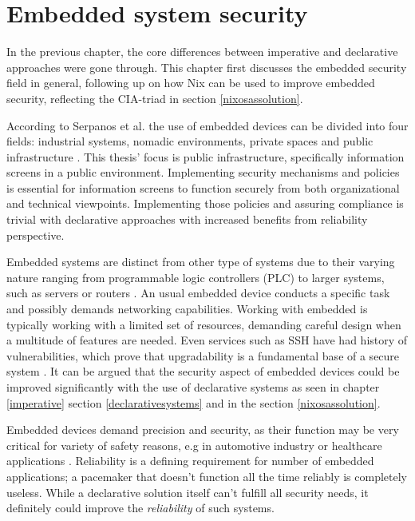 \chapter{Embedded system security} \label{embedded}

In the previous chapter, the core differences between imperative and
declarative approaches were gone through. This chapter first discusses
the embedded security field in general, following up on how Nix can be
used to improve embedded security, reflecting the CIA-triad in section
\ref{nixosassolution}.

According to Serpanos et al. the use of embedded devices can be
divided into four fields: industrial systems, nomadic environments,
private spaces and public infrastructure
\cite{serpanos2013security}. This thesis' focus is public
infrastructure, specifically information screens in a public
environment. Implementing security mechanisms and policies is
essential for information screens to function securely from both
organizational and technical viewpoints. Implementing those policies
and assuring compliance is trivial with declarative approaches with
increased benefits from reliability perspective.

Embedded systems are distinct from other type of systems due to their
varying nature ranging from programmable logic controllers (PLC) to
larger systems, such as servers or
routers \cite{fysarakis2014embedded}. An usual embedded device
conducts a specific task and possibly demands networking
capabilities. Working with embedded is typically working with a
limited set of resources, demanding careful design when a multitude of
features are needed. Even services such as SSH have
had history of vulnerabilities, which prove that upgradability is a
fundamental base of a secure system
\cite{secopsolutionHistorySecOps}. It can be argued that the security aspect of
embedded devices could be improved significantly with the use of
declarative systems as seen in chapter \ref{imperative} section
\ref{declarativesystems} and in the section
\ref{nixosassolution}.

Embedded devices demand precision and security, as their function may
be very critical for variety of safety reasons, e.g in automotive
industry or healthcare applications \cite{turab2019secure,
  fysarakis2014embedded}. Reliability is a defining requirement for
number of embedded applications; a pacemaker that doesn't function all
the time reliably is completely useless. While a declarative solution
itself can't fulfill all security needs, it definitely could improve
the \textit{reliability} of such systems.

